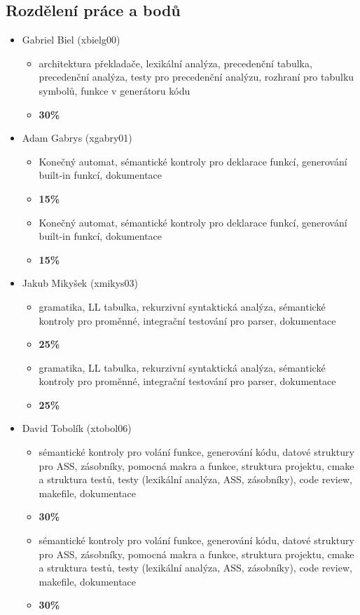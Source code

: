 \documentclass[a4paper, 12pt]{article}
\begin{document}
    \subsection{Rozdělení práce a bodů}
        \begin{itemize}
            \item Gabriel Biel (xbielg00)
                \begin{itemize}
                    \item architektura překladače, lexikální analýza, precedenční tabulka, precedenční analýza, testy pro precedenční analýzu, rozhraní pro tabulku symbolů, funkce v generátoru kódu
                    \item \textbf{30\%}
                \end{itemize}
            \item Adam Gabrys (xgabry01)
                \begin{itemize}
                    \item Konečný automat, sémantické kontroly pro deklarace funkcí, generování built-in funkcí, dokumentace
                    \item \textbf{15\%}
                    \item Konečný automat, sémantické kontroly pro deklarace funkcí, generování built-in funkcí, dokumentace
                    \item \textbf{15\%}
                \end{itemize}
            \item Jakub Mikyšek (xmikys03)
                \begin{itemize}
                    \item gramatika, LL tabulka, rekurzivní syntaktická analýza, sémantické kontroly pro proměnné, integrační testování pro parser, dokumentace
                    \item \textbf{25\%}
                    \item gramatika, LL tabulka, rekurzivní syntaktická analýza, sémantické kontroly pro proměnné, integrační testování pro parser, dokumentace
                    \item \textbf{25\%}
                \end{itemize}
            \item David Tobolík (xtobol06)
                \begin{itemize}
                    \item sémantické kontroly pro volání funkce, generování kódu, datové struktury pro ASS, zásobníky, pomocná makra a funkce, struktura projektu, cmake a struktura testů, testy (lexikální analýza, ASS, zásobníky), code review, makefile, dokumentace
                    \item \textbf{30\%}
                    \item sémantické kontroly pro volání funkce, generování kódu, datové struktury pro ASS, zásobníky, pomocná makra a funkce, struktura projektu, cmake a struktura testů, testy (lexikální analýza, ASS, zásobníky), code review, makefile, dokumentace
                    \item \textbf{30\%}
                \end{itemize}
        \end{itemize}
\end{document}
